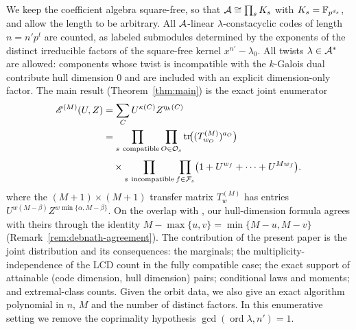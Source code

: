 We keep the coefficient algebra square-free, so that
$\mathcal A\cong\prod_s K_s$ with $K_s=\mathbb F_{p^{d_s}}$, and allow the length to be
arbitrary. All $\mathcal A$-linear $\lambda$-constacyclic codes of length $n=n'p^t$
are counted, as labeled submodules determined by the exponents of the
distinct irreducible factors of the square-free kernel $x^{n'}-\lambda_0$.
All twists $\lambda\in\mathcal A^\ast$ are allowed: components whose twist is
incompatible with the $k$-Galois dual contribute hull dimension $0$ and are
included with an explicit dimension-only factor. The main result
(Theorem~\ref{thm:main}) is the exact joint enumerator
{\small
\begin{align*}
\mathscr E^{(M)}(U,Z)
&= \sum_C U^{\kappa(C)} Z^{\eta_k(C)}\\
&= \prod_{s\ \mathrm{compatible}}
   \prod_{O\in\mathcal O_s}
   \operatorname{tr}\!\bigl((T^{(M)}_{w_O})^{a_O}\bigr)
   \\[3pt]
&\quad{}\times
   \prod_{s\ \mathrm{incompatible}}
   \prod_{f\in\mathcal F_s}
   \bigl(1+U^{w_f}+\cdots+U^{Mw_f}\bigr).
\end{align*}
}
where the $(M+1)\times(M+1)$ transfer matrix $T^{(M)}_w$ has entries
$U^{w(M-\beta)}Z^{w\min\{\alpha,M-\beta\}}$. On the overlap with
\cite{debnathAffine2026}, our hull-dimension formula agrees with theirs
through the identity $M-\max\{u,v\}=\min\{M-u,M-v\}$
(Remark~\ref{rem:debnath-agreement}). The contribution of the present paper
is the joint distribution and its consequences: the marginals; the
multiplicity-independence of the LCD count in the fully compatible case;
the exact support of attainable (code dimension, hull dimension) pairs;
conditional laws and moments; and extremal-class counts. Given the orbit
data, we also give an exact algorithm polynomial in $n$, $M$ and the number of
distinct factors. In this enumerative setting we remove the coprimality
hypothesis $\gcd(\operatorname{ord}\lambda,n')=1$.



